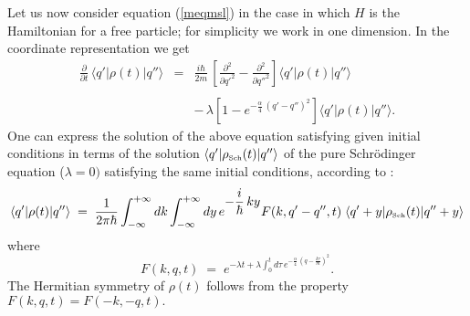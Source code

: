 \documentclass[10pt,a4paper]{article}
\begin{document}
Let us now consider equation (\ref{meqmsl}) in the case in which
$H$ is the Hamiltonian for a free particle; for simplicity we work
in one dimension. In the coordinate representation we get
\begin{eqnarray} \label{mepr}
\frac{\partial}{\partial t}\, \langle q'|\rho(t)| q''\rangle & = &
\frac{i\hbar}{2m}\, \left[\frac{\partial^{2}}{\partial {q'}^{2}} -
\frac{\partial^{2}}{\partial {q''}^{2}}\right] \langle q'|\rho(t)|
q''\rangle
\nonumber \\
& & \nonumber \\
& & -\,\lambda \left[ 1 - e^{\displaystyle - \frac{\alpha}{4}\,
(q' - q'')^{2}} \right] \langle q'|\rho(t)| q''\rangle.
\end{eqnarray}
One can express the solution of the above equation satisfying
given initial conditions in terms of the solution $\langle q' |
\rho_{\makebox{\tiny Sch}}(t) | q''\rangle$ of the pure
Schr\"odinger equation ($\lambda = 0)$ satisfying the same initial
conditions, according to \cite{grw}:
\begin{equation} \label{gfh}
\langle q'|\rho(t)| q''\rangle \; = \;
\frac{1}{2\pi\hbar}\int_{-\infty}^{+\infty} dk
\int_{-\infty}^{+\infty} dy\, e^{\displaystyle
-\frac{i}{\hbar}\,ky} F(k, q'-q'', t)\; \langle q' + y |
\rho_{\makebox{\tiny Sch}}(t) | q'' + y \rangle
\end{equation}
where
\begin{equation} \label{rcf}
F(k,q,t) \; = \; e^{\displaystyle -\lambda t + \lambda
\int_{0}^{t} d\tau\, e^{\displaystyle -\frac{\alpha}{4}\, \left( q
- \frac{k\tau}{m}\right)^{2}}}.
\end{equation}
The Hermitian symmetry of $\rho(t)$ follows from the property
$F(k,q,t) = F(-k, -q, t).$
\end{document}
